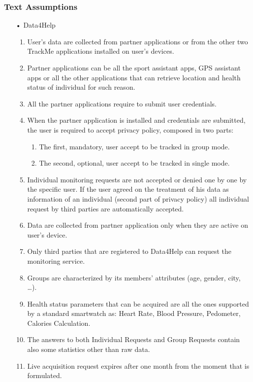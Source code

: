 \subsubsection{Text Assumptions}
\begin{enumerate}

\item[•] {\Large Data4Help}
	\begin{enumerate}
	\item User's data are collected from partner applications or from the other two TrackMe applications installed on user's devices.
	\item Partner applications can be all the sport assistant apps, GPS assistant apps or all the other applications that can retrieve location and health status of individual for such reason.
	\item All the partner applications require to submit user credentials. 
	\item When the partner application is installed and credentials are submitted,
	the user is required to accept privacy policy, composed in two parts:
		\begin{enumerate}
		\item The first, mandatory, user accept to be tracked in group mode.
		\item The second, optional, user accept to be tracked in single mode.
		\end{enumerate}
	\item Individual monitoring requests are not accepted or denied one by one by the specific user. If the user agreed on the treatment of his data as information of an individual (second part of privacy policy) all individual request by third parties are automatically accepted.	
	\item Data are collected from partner application only when they are active on user's device.
	\item Only third parties that are registered to Data4Help can request the monitoring service.
	\item Groups are characterized by its members' attributes (age, gender, city, …).
	\item Health status parameters that can be acquired are all the ones supported by a standard smartwatch as: Heart Rate, Blood Pressure, Pedometer, Calories Calculation.
	\item The answers to both Individual Requests and Group Requests contain also some statistics other than raw data.
	\item Live acquisition request expires after one month from the moment that is formulated.
	\end{enumerate}
	

\end{enumerate}
